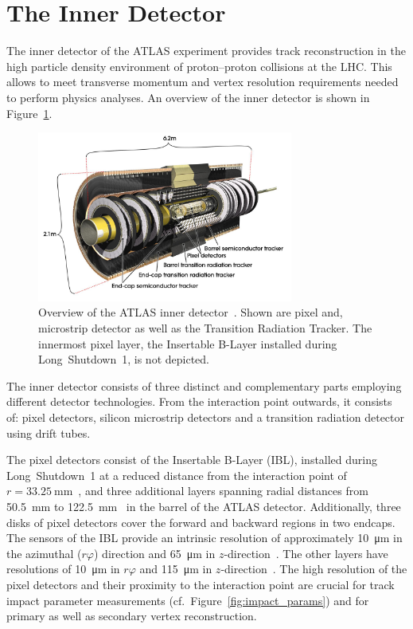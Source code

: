 \section{The Inner Detector}
\label{sec:atlas_tracking}

The inner detector of the ATLAS experiment provides track reconstruction in the
high particle density environment of proton--proton collisions at the LHC. This
allows to meet transverse momentum and vertex resolution requirements needed to
perform physics analyses. An overview of the inner detector is shown in
Figure~\ref{fig:atlas_indet}.

\begin{figure}[htb]
  \centering
  \includegraphics[width=0.75\textwidth]{./figures/atlas/inner_detector.jpg}
  \caption{Overview of the ATLAS inner detector~\cite{indet_fig}. Shown are
    pixel and, microstrip detector as well as the Transition Radiation Tracker.
    The innermost pixel layer, the Insertable B-Layer installed during
    Long~Shutdown~1, is not depicted.}
  \label{fig:atlas_indet}
\end{figure}

The inner detector consists of three distinct and complementary parts employing
different detector technologies. From the interaction point outwards, it
consists of: pixel detectors, silicon microstrip detectors and a transition
radiation detector using drift tubes.

The pixel detectors consist of the Insertable B-Layer (IBL), installed during
Long~Shutdown~1 at a reduced distance from the interaction point
of~$r = \SI{33.25}{\milli\metre}$~\cite{ibl_tdr}, and three additional layers
spanning radial distances from \SI{50.5}{\milli\metre} to
\SI{122.5}{\milli\metre}~\cite{atlas_detector} in the barrel of the ATLAS
detector. Additionally, three disks of pixel detectors cover the forward and
backward regions in two endcaps. The sensors of the IBL provide an intrinsic
resolution of approximately \SI{10}{\micro\metre} in the azimuthal ($r\varphi$)
direction and \SI{65}{\micro\metre} in $z$-direction~\cite{ibl_measurement}. The
other layers have resolutions of \SI{10}{\micro\metre} in $r\varphi$ and
\SI{115}{\micro\metre} in $z$-direction~\cite{atlas_detector}. The high
resolution of the pixel detectors and their proximity to the interaction point
are crucial for track impact parameter measurements (cf.\
Figure~\ref{fig:impact_params}) and for primary as well as secondary vertex
reconstruction.

